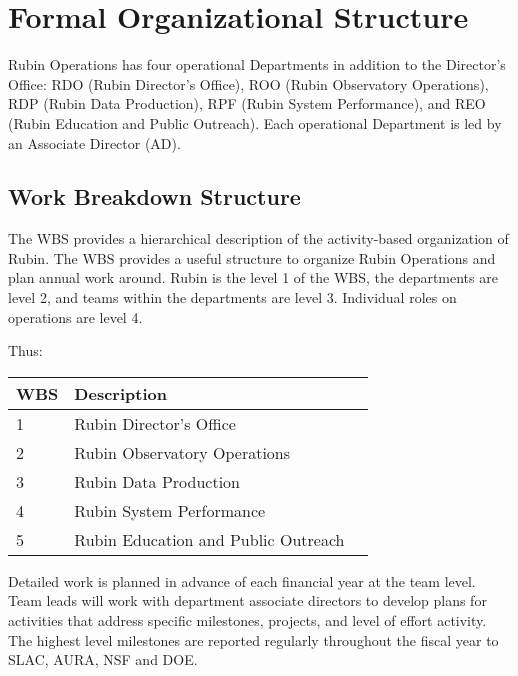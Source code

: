 \section{Formal Organizational Structure}
\label{sec:structure}

Rubin Operations has four operational Departments in addition to the Director’s Office: RDO (Rubin Director’s Office), ROO (Rubin Observatory Operations), RDP (Rubin Data Production), RPF (Rubin System Performance), and REO (Rubin Education and Public Outreach). 
Each operational Department is led by an Associate Director (AD).

\subsection{Work Breakdown Structure}
\label{sec:wbs}

The \gls{WBS} provides a hierarchical description of the activity-based organization of Rubin. 
The WBS provides a useful structure to organize Rubin Operations and plan annual work around. 
Rubin is the level 1 of the WBS, the departments are level 2, and teams within the departments are level 3. 
Individual roles on operations are level 4.   

Thus:

\begin{longtable}[]{@{}lll@{}}
\hline
\gls{WBS} & Description \tabularnewline
\hline
\endhead

1 & Rubin Director's Office  \tabularnewline
2 & Rubin Observatory Operations  \tabularnewline
3 & Rubin Data Production \tabularnewline
4 & Rubin System Performance  \tabularnewline
5 & Rubin Education and Public Outreach \tabularnewline

\hline
\end{longtable}


Detailed work is planned in advance of each financial year at the team level. 
Team leads will work with department associate directors to develop plans for activities that address specific milestones, projects, and level of effort activity. 
The highest level milestones are reported regularly throughout the fiscal year to SLAC, AURA, NSF and DOE. 


